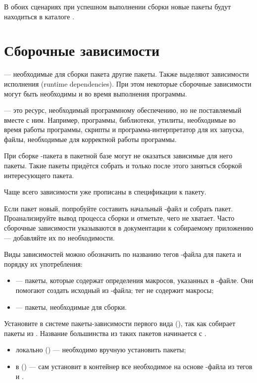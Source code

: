 В обоих сценариях при успешном выполнении сборки новые пакеты будут находиться в каталоге 
. 


\section{Сборочные зависимости}
 --- необходимые для сборки пакета другие пакеты. 
Также выделяют зависимости исполнения (runtime dependencies). При этом некоторые сборочные зависимости 
могут быть необходимы и во время выполнения программы. 

 --- это ресурс, необходимый программному обеспечению, но не поставляемый вместе с ним. 
Например, программы, библиотеки, утилиты, необходимые во время работы программы, скрипты и 
программа-интерпретатор для их запуска, файлы, необходимые для корректной работы программы. 

При сборке -пакета в пакетной базе  могут не оказаться зависимые для него пакеты. 
Такие пакеты придётся собрать и только после этого заняться сборкой интересующего пакета. 


Чаще всего зависимости уже прописаны в спецификации к пакету.

Если пакет новый, попробуйте составить начальный -файл и собрать пакет. Проанализируйте 
вывод процесса сборки и отметьте, чего не хватает. Часто сборочные зависимости указываются в 
документации к собираемому приложению --- добавляйте их по необходимости.

Виды зависимостей можно обозначить по названию тегов -файла для пакета и порядку их употребления: 
\begin{itemize}
	\item {} --- пакеты, которые содержат определения макросов, указанных 
		в -файле. Они помогают создать исходный  из -файла; 
		тег не содержит макросы;
	\item {} --- пакеты, необходимые для сборки.
\end{itemize}

Установите в системе пакеты-зависимости первого вида (), так как  
собирает пакеты из . Название большинства из таких пакетов начинается с .

\begin{itemize}
	\item локально () --- необходимо вручную установить пакеты;
	\item в  () ---  сам установит в контейнер все 
		необходимое на основе -файла из тегов  и 
		.
\end{itemize} 

